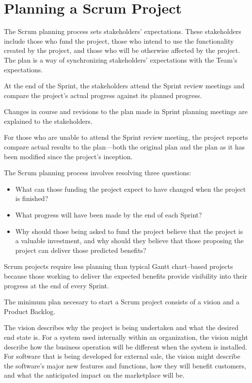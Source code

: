 \pagebreak
\chapter{Planning a Scrum Project}

The Scrum planning process sets stakeholders’ expectations. These stakeholders include those who fund the project, those who intend to use the functionality created by the project, and those who will be otherwise affected by the project. The plan is a way of synchronizing stakeholders’ expectations with the Team’s expectations.

At the end of the Sprint, the stakeholders attend the Sprint review meetings and compare the project’s actual progress against its planned progress.

Changes in course and revisions to the plan made in Sprint planning meetings are explained to the stakeholders.

For those who are unable to attend the Sprint review meeting, the project reports compare actual results to the plan—both the original plan and the plan as it has been modified since the project’s inception.

The Scrum planning process involves resolving three questions:

\begin{itemize}
  \item What can those funding the project expect to have changed when the project is finished?
  \item What progress will have been made by the end of each Sprint?
  \item Why should those being asked to fund the project believe that the project is a valuable investment, and why should they believe that those proposing the project can deliver those predicted benefits?
\end{itemize}


Scrum projects require less planning than typical Gantt chart–based projects because those working to deliver the expected benefits provide visibility into their progress at the end of every Sprint.


The minimum plan necesary to start a Scrum project consists of a vision and a Product Backlog.

The vision describes why the project is being undertaken and what the desired end state is. For a system used internally within an organization, the vision might describe how the business operation will be different when the system is installed. For software that is being developed for external sale, the vision might describe the software’s major new features and functions, how they will benefit customers, and what the anticipated impact on the marketplace will be.

